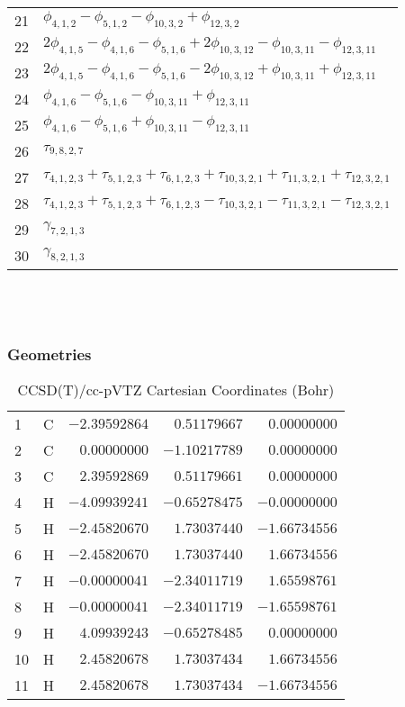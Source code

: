 \documentclass[10pt,oneside]{article}
\begin{document}
\begin{table}[h!]
\begin{tabular}{ll}
  21  & $\phi_{4,1,2} - \phi_{5,1,2} - \phi_{10,3,2} + \phi_{12,3,2}$ \\
  22  & $2\phi_{4,1,5} - \phi_{4,1,6} - \phi_{5,1,6} + 2\phi_{10,3,12} - \phi_{10,3,11} - \phi_{12,3,11}$ \\
  23  & $2\phi_{4,1,5} - \phi_{4,1,6} - \phi_{5,1,6} - 2\phi_{10,3,12} + \phi_{10,3,11} + \phi_{12,3,11}$ \\
  24  & $\phi_{4,1,6} - \phi_{5,1,6} - \phi_{10,3,11} + \phi_{12,3,11}$ \\
  25  & $\phi_{4,1,6} - \phi_{5,1,6} + \phi_{10,3,11} - \phi_{12,3,11}$ \\
  26  & $\tau_{9,8,2,7}$ \\
  27  & $\tau_{4,1,2,3} + \tau_{5,1,2,3} + \tau_{6,1,2,3} + \tau_{10,3,2,1} + \tau_{11,3,2,1} + \tau_{12,3,2,1}$ \\
  28  & $\tau_{4,1,2,3} + \tau_{5,1,2,3} + \tau_{6,1,2,3} - \tau_{10,3,2,1} - \tau_{11,3,2,1} - \tau_{12,3,2,1}$ \\
  29  & $\gamma_{7,2,1,3}$ \\
  30  & $\gamma_{8,2,1,3}$ \\
\end{tabular}
\end{table}

\clearpage

\subsection{\ \ \ }

\subsubsection*{Geometries}
\begin{table}[h!]
\centering
\caption{CCSD(T)/cc-pVTZ Cartesian Coordinates (Bohr)}
\begin{tabular}{llrrr}
1  & C  & $-2.39592864$ & $ 0.51179667$ & $ 0.00000000$ \\
2  & C  & $ 0.00000000$ & $-1.10217789$ & $ 0.00000000$ \\
3  & C  & $ 2.39592869$ & $ 0.51179661$ & $ 0.00000000$ \\
4  & H  & $-4.09939241$ & $-0.65278475$ & $-0.00000000$ \\
5  & H  & $-2.45820670$ & $ 1.73037440$ & $-1.66734556$ \\
6  & H  & $-2.45820670$ & $ 1.73037440$ & $ 1.66734556$ \\
7  & H  & $-0.00000041$ & $-2.34011719$ & $ 1.65598761$ \\
8  & H  & $-0.00000041$ & $-2.34011719$ & $-1.65598761$ \\
9  & H  & $ 4.09939243$ & $-0.65278485$ & $ 0.00000000$ \\
10 & H  & $ 2.45820678$ & $ 1.73037434$ & $ 1.66734556$ \\
11 & H  & $ 2.45820678$ & $ 1.73037434$ & $-1.66734556$ \\
\end{tabular}
\end{table}
\end{document}
